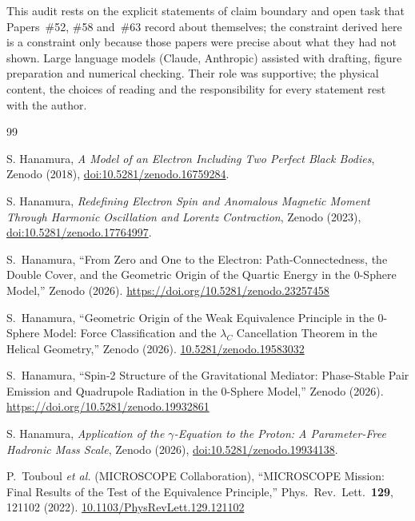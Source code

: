 \documentclass[%
 reprint, amsmath,amssymb, aps, prb, ]{revtex4-2}
\numberwithin{equation}{section}
\begin{document}
\begin{acknowledgments}
This audit rests on the explicit statements of claim boundary and open task that Papers~\#52, \#58 and~\#63 record about themselves; the constraint derived here is a constraint only because those papers were precise about what they had not shown. Large language models (Claude, Anthropic) assisted with drafting, figure preparation and numerical checking. Their role was supportive; the physical content, the choices of reading and the responsibility for every statement rest with the author.
\end{acknowledgments}

\begin{thebibliography}{99}

 S. Hanamura, \emph{A Model of an Electron Including Two Perfect Black Bodies}, Zenodo (2018), \href{https://doi.org/10.5281/zenodo.16759284}{doi:10.5281/zenodo.16759284}.

 S. Hanamura, \emph{Redefining Electron Spin and Anomalous Magnetic Moment Through Harmonic Oscillation and Lorentz Contraction}, Zenodo (2023), \href{https://doi.org/10.5281/zenodo.17764997}{doi:10.5281/zenodo.17764997}.

 S.~Hanamura, ``From Zero and One to the Electron: Path-Connectedness, the Double Cover, and the Geometric Origin of the Quartic Energy in the 0-Sphere Model,'' Zenodo (2026). \href{https://doi.org/10.5281/zenodo.23257458}{https://doi.org/10.5281/zenodo.23257458}

 S.~Hanamura, ``Geometric Origin of the Weak Equivalence Principle in the 0-Sphere Model: Force Classification and the $\lambda_C$ Cancellation Theorem in the Helical Geometry,'' Zenodo (2026). \href{https://doi.org/10.5281/zenodo.19583032}{10.5281/zenodo.19583032}

 S.~Hanamura, ``Spin-2 Structure of the Gravitational Mediator: Phase-Stable Pair Emission and Quadrupole Radiation in the 0-Sphere Model,'' Zenodo (2026). \href{https://doi.org/10.5281/zenodo.19932861}{https://doi.org/10.5281/zenodo.19932861}

 S. Hanamura, \emph{Application of the $\gamma$-Equation to the Proton: A Parameter-Free Hadronic Mass Scale}, Zenodo (2026), \href{https://doi.org/10.5281/zenodo.19934138}{doi:10.5281/zenodo.19934138}.

 P.~Touboul \textit{et al.} (MICROSCOPE Collaboration), ``MICROSCOPE Mission: Final Results of the Test of the Equivalence Principle,'' Phys.\ Rev.\ Lett.\ \textbf{129}, 121102 (2022). \href{https://doi.org/10.1103/PhysRevLett.129.121102}{10.1103/PhysRevLett.129.121102}


\end{thebibliography}
\end{document}

